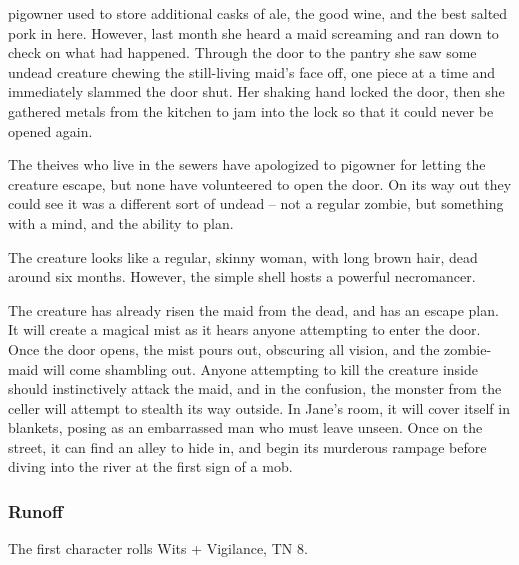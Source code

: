 \Gls{pigowner} used to store additional casks of ale, the good wine, and the best salted pork in here.  However, last month she heard a maid screaming and ran down to check on what had happened.  Through the door to the pantry she saw some undead creature chewing the still-living maid's face off, one piece at a time and immediately slammed the door shut.  Her shaking hand locked the door, then she gathered metals from the kitchen to jam into the lock so that it could never be opened again.

The theives who live in the sewers have apologized to \gls{pigowner} for letting the creature escape, but none have volunteered to open the door.  On its way out they could see it was a different sort of undead -- not a regular zombie, but something with a mind, and the ability to plan.

The creature looks like a regular, skinny woman, with long brown hair, dead around six months.  However, the simple shell hosts a powerful necromancer.



The creature has already risen the maid from the dead, and has an escape plan.  It will create a magical mist as it hears anyone attempting to enter the door.  Once the door opens, the mist pours out, obscuring all vision, and the zombie-maid will come shambling out.  Anyone attempting to kill the creature inside should instinctively attack the maid, and in the confusion, the monster from the celler will attempt to stealth its way outside.  In Jane's room, it will cover itself in blankets, posing as an embarrassed man who must leave unseen.  Once on the street, it can find an alley to hide in, and begin its murderous rampage before diving into the river at the first sign of a mob.




\subsubsection{Runoff}

The first character rolls Wits + Vigilance, TN 8.


